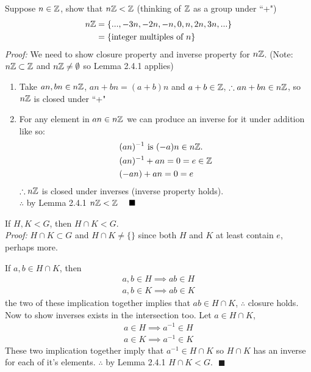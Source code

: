 \begin{example}
Suppose $n\in {\mathbb{Z}}$, show that $n{\mathbb{Z}}<{\mathbb{Z}}$ (thinking of ${\mathbb{Z}}$ as a group under ``+")\\
\begin{align}
    n{\mathbb{Z}}&=\{...,-3n,-2n,-n,0,n,2n,3n,...\}\nonumber\\
    &=\{\text{integer multiples of }n\}\nonumber
\end{align}
\textit{Proof:} We need to show closure property and inverse property for $n{\mathbb{Z}}$. (Note:
$n{\mathbb{Z}}\subset {\mathbb{Z}}$ and $n{\mathbb{Z}}\neq \emptyset$ so Lemma 2.4.1 applies)
\begin{enumerate}[label=\roman*)]
    \item Take $an,bn\in n{\mathbb{Z}}$, $an+bn=(a+b)n$ and $a+b\in {\mathbb{Z}}$, $\therefore an+bn\in n{\mathbb{Z}}$, so $n{\mathbb{Z}}$
    is closed under ``+"
    \item For any element in $an\in n{\mathbb{Z}}$ we can produce an inverse for it under addition like so:
    \begin{align}
        &(an)^{-1} \text{ is } (-a)n\in n{\mathbb{Z}}. \nonumber \\
        &(an)^{-1}+an=0=e\in {\mathbb{Z}} \nonumber \\
        &(-an)+an=0=e\nonumber
    \end{align}
    $\therefore n{\mathbb{Z}}$ is closed under inverses (inverse property holds).\\
    \noindent$\therefore$ by Lemma 2.4.1 $n\Z<\Z \ \ \ \ \blacksquare$
\end{enumerate}
\end{example}

\begin{example}
If $H,K<G$, then $H\cap K < G$.\\
\textit{Proof:} $H\cap K\subset G$ and $H\cap K\neq \{\}$ since both $H$ and $K$ at least contain
$e$, perhaps more.\steezybreak

\noindent If $a,b\in H\cap K$, then
\begin{align}
    a,b\in H \implies ab\in H \nonumber \\
    a,b\in K \implies ab\in K \nonumber
\end{align}
the two of these implication together implies that $ab\in H\cap K$, $\therefore$ closure holds. Now
to show inverses exists in the intersection too. Let $a\in H\cap K$,
\begin{align}
    a\in H \implies a^{-1}\in H \nonumber \\
    a\in K \implies a^{-1}\in K \nonumber
\end{align}
These two implication together imply that $a^{-1}\in H\cap K$ so $H\cap K$ has an inverse for each
of it's elements. $\therefore$ by Lemma 2.4.1 $H\cap K < G. \ \ \ \blacksquare$
\end{example}


